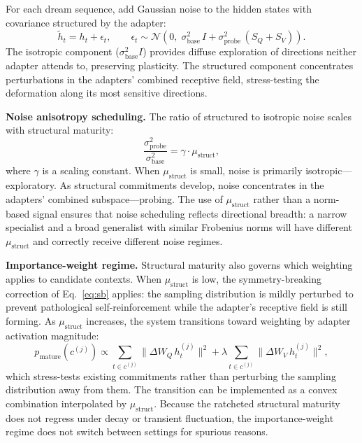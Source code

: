 \documentclass[11pt]{article}
\newcommand{\norm}[1]{\lVert #1 \rVert}
\begin{document}
For each dream sequence, add Gaussian noise to the hidden states with covariance structured by the adapter:
\begin{equation}\label{eq:noise}
    \tilde{h}_t = h_t + \epsilon_t, \qquad \epsilon_t \sim \mathcal{N}\!\left(0,\; \sigma_\text{base}^2 \, I + \sigma_\text{probe}^2 \, (S_Q + S_V)\right).
\end{equation}
The isotropic component ($\sigma_\text{base}^2 I$) provides diffuse exploration of directions neither adapter attends to, preserving plasticity. The structured component concentrates perturbations in the adapters' combined receptive field, stress-testing the deformation along its most sensitive directions.

\textbf{Noise anisotropy scheduling.} The ratio of structured to isotropic noise scales with structural maturity:
\begin{equation}
    \frac{\sigma_\text{probe}^2}{\sigma_\text{base}^2} = \gamma \cdot \mu_\text{struct},
\end{equation}
where $\gamma$ is a scaling constant. When $\mu_\text{struct}$ is small, noise is primarily isotropic---exploratory. As structural commitments develop, noise concentrates in the adapters' combined subspace---probing. The use of $\mu_\text{struct}$ rather than a norm-based signal ensures that noise scheduling reflects directional breadth: a narrow specialist and a broad generalist with similar Frobenius norms will have different $\mu_\text{struct}$ and correctly receive different noise regimes.

\textbf{Importance-weight regime.} Structural maturity also governs which weighting applies to candidate contexts. When $\mu_\text{struct}$ is low, the symmetry-breaking correction of Eq.~\eqref{eq:sb} applies: the sampling distribution is mildly perturbed to prevent pathological self-reinforcement while the adapter's receptive field is still forming. As $\mu_\text{struct}$ increases, the system transitions toward weighting by adapter activation magnitude:
\begin{equation}\label{eq:mature}
    p_\text{mature}(c^{(j)}) \propto \sum_{t \in c^{(j)}} \norm{\Delta W_Q \, h_t^{(j)}}^2 + \lambda \sum_{t \in c^{(j)}} \norm{\Delta W_V \, h_t^{(j)}}^2,
\end{equation}
which stress-tests existing commitments rather than perturbing the sampling distribution away from them. The transition can be implemented as a convex combination interpolated by $\mu_\text{struct}$. Because the ratcheted structural maturity does not regress under decay or transient fluctuation, the importance-weight regime does not switch between settings for spurious reasons.
\end{document}
